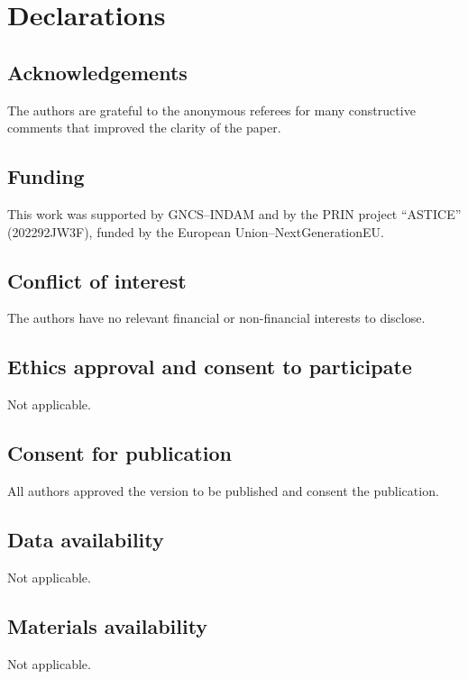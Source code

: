 \documentclass[a4paper,10pt]{article}
\begin{document}

\section*{Declarations}
\subsection*{Acknowledgements} 
The authors are grateful to the anonymous referees for many constructive comments that improved the clarity of the paper.

\subsection*{Funding} This work was supported by GNCS--INDAM and by the PRIN project ``ASTICE'' (202292JW3F), funded by the European Union--NextGenerationEU.

\subsection*{Conflict of interest} The authors have no relevant financial or non-financial interests to disclose.

\subsection*{Ethics approval and consent to participate} Not applicable.

\subsection*{Consent for publication} All authors approved the version to be published and consent the publication.

\subsection*{Data availability} Not applicable.

\subsection*{Materials availability} Not applicable.
\end{document}

